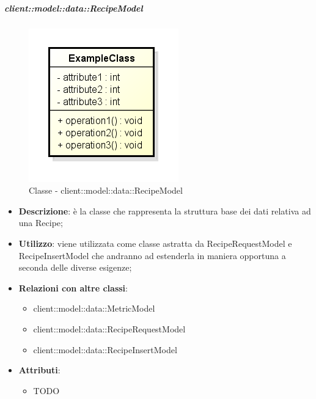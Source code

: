 		\subparagraph{client::model::data::RecipeModel} %
		\label{subp:client_model_data_recipe}
			\begin{figure}[htbp]
				\centering
				\centerline{\includegraphics[scale=0.7]{./images/client/classes/example_class.png}}
				\caption{Classe - client::model::data::RecipeModel}
			\end{figure}
			\begin{itemize}
				\item \textbf{Descrizione}: è la classe che rappresenta la struttura base dei dati relativa ad una Recipe;
				\item \textbf{Utilizzo}: viene utilizzata come classe astratta da RecipeRequestModel e RecipeInsertModel che andranno ad estenderla in maniera opportuna a seconda delle diverse esigenze;
				\item \textbf{Relazioni con altre classi}:
					\begin{itemize}
						\item client::model::data::MetricModel
						\item client::model::data::RecipeRequestModel
						\item client::model::data::RecipeInsertModel
					\end{itemize}
				\item \textbf{Attributi}:
					\begin{itemize}
						\item TODO
					\end{itemize}
			\end{itemize}


